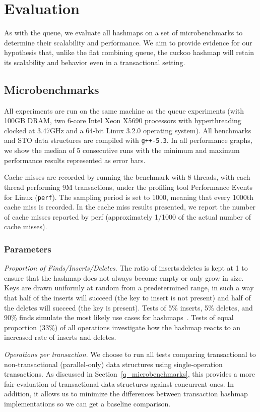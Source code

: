 \section{Evaluation}
\label{hm_eval}

As with the queue, we evaluate all hashmaps on a set of microbenchmarks to determine their scalability and performance. We aim to provide evidence for our hypothesis that, unlike the flat combining queue, the cuckoo hashmap will retain its scalability and behavior even in a transactional setting.

\subsection{Microbenchmarks}
All experiments are run on the same machine as the queue experiments (with 100GB DRAM, two 6-core Intel Xeon X5690 processors with hyperthreading clocked at 3.47GHz and a 64-bit Linux 3.2.0 operating system). All benchmarks and STO data structures are compiled with \texttt{g++-5.3}. In all performance graphs, we show the median of 5 consecutive runs with the minimum and maximum performance results represented as error bars.

Cache misses are recorded by running the benchmark with 8 threads, with each thread performing 9M transactions, under the profiling tool Performance Events for Linux (\texttt{perf}). The sampling period is set to 1000, meaning that every 1000th cache miss is recorded.
In the cache miss results presented, we report the number of cache misses reported by perf (approximately 1/1000 of the actual number of cache misses).

\subsubsection{Parameters}

    \emph{Proportion of Finds/Inserts/Deletes}. The ratio of inserts:deletes is kept at 1 to ensure that the hashmap does not always become empty or only grow in size. Keys are drawn uniformly at random from a predetermined range, in such a way that half of the inserts will succeed (the key to insert is not present) and half of the deletes will succeed (the key is present). Tests of 5\% inserts, 5\% deletes, and 90\% finds simulate the most likely use cases for hashmaps~\cite{hm1}. Tests of equal proportion (33\%) of all operations investigate how the hashmap reacts to an increased rate of inserts and deletes.

\emph{Operations per transaction}. We choose to run all tests comparing transactional to non-transactional (parallel-only) data structures using single-operation transactions. As discussed in Section~\ref{q_microbenchmarks}, this provides a more fair evaluation of transactional data structures against concurrent ones. In addition, it allows us to minimize the differences between transaction hashmap implementations so we can get a baseline comparison.

